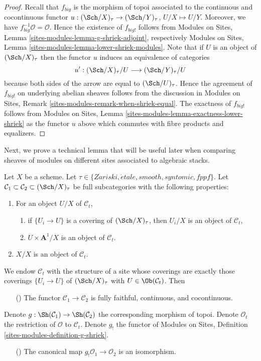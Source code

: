 \begin{proof}
Recall that $f_{big}$ is the morphism of topoi associated to the
continuous and cocontinuous functor
$u : (\Sch/X)_\tau \to (\Sch/Y)_\tau$, $U/X \mapsto U/Y$.
Moreover, we have $f_{big}^{-1}\mathcal{O} = \mathcal{O}$.
Hence the existence of $f_{big!}$ follows from
Modules on Sites, Lemma \ref{sites-modules-lemma-g-shriek-adjoint},
respectively
Modules on Sites, Lemma \ref{sites-modules-lemma-lower-shriek-modules}.
Note that if $U$ is an object of $(\Sch/X)_\tau$ then the functor
$u$ induces an equivalence of categories
$$
u' :
(\Sch/X)_\tau/U
\longrightarrow
(\Sch/Y)_\tau/U
$$
because both sides of the arrow are equal to $(\Sch/U)_\tau$.
Hence the agreement of $f_{big!}$ on underlying abelian sheaves
follows from the discussion in
Modules on Sites, Remark \ref{sites-modules-remark-when-shriek-equal}.
The exactness of $f_{big!}$ follows from
Modules on Sites, Lemma \ref{sites-modules-lemma-exactness-lower-shriek}
as the functor $u$ above which commutes with fibre products and equalizers.
\end{proof}

\noindent
Next, we prove a technical lemma that will be useful later when comparing
sheaves of modules on different sites associated to algebraic stacks.

\begin{lemma}
\label{lemma-compare-structure-sheaves}
Let $X$ be a scheme. Let
$\tau \in \{Zariski, \acute{e}tale, smooth, syntomic, fppf\}$.
Let $\mathcal{C}_1 \subset \mathcal{C}_2 \subset (\Sch/X)_\tau$ be full
subcategories with the following properties:
\begin{enumerate}
\item For an object $U/X$ of $\mathcal{C}_t$,
\begin{enumerate}
\item if $\{U_i \to U\}$ is a covering of $(\Sch/X)_\tau$, then
$U_i/X$ is an object of $\mathcal{C}_t$,
\item $U \times \mathbf{A}^1/X$ is an object of $\mathcal{C}_t$.
\end{enumerate}
\item $X/X$ is an object of $\mathcal{C}_t$.
\end{enumerate}
We endow $\mathcal{C}_t$ with the structure of a site whose coverings are
exactly those coverings $\{U_i \to U\}$ of $(\Sch/X)_\tau$ with
$U \in \Ob(\mathcal{C}_t)$. Then
\begin{enumerate}
\item[(\romannumeral1)] The functor $\mathcal{C}_1 \to \mathcal{C}_2$
is fully faithful, continuous, and cocontinuous.
\end{enumerate}
Denote $g : \Sh(\mathcal{C}_1) \to \Sh(\mathcal{C}_2)$ the corresponding
morphism of topoi. Denote $\mathcal{O}_t$ the restriction of $\mathcal{O}$
to $\mathcal{C}_t$. Denote $g_!$ the functor of
Modules on Sites, Definition \ref{sites-modules-definition-g-shriek}.
\begin{enumerate}
\item[(\romannumeral2)] The canonical map $g_!\mathcal{O}_1 \to \mathcal{O}_2$
is an isomorphism.
\end{enumerate}
\end{lemma}

